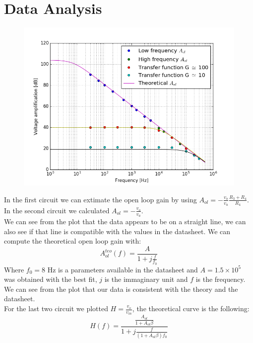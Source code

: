 \section{Data Analysis}
\begin{figure}[H]
\centering
\includegraphics[width=.7\textwidth]{4/decibel.png}
\end{figure}
In the first circuit we can extimate the open loop gain by using $A_{ol} = - \frac{v_{o}}{v_a} \frac{R_3 + R_4}{R_4}$.
In the second circuit we calculated $A_{ol} = - \frac{v_{o}}{v_a}$. \\
We can see from the plot that the data appears to be on a straight line, we can also see if that line is compatible with the values in the datasheet. We can compute the theoretical open loop gain with: $$A_{ol}^{teo}(f) = \frac{A}{1 + j\frac{f}{f_0}}$$ Where $f_0 = 8$ Hz is a parameters available in the datasheet and  $A = 1.5 \times 10^5$ was obtained with the best fit, $j$ is the immaginary unit and $f$ is the frequency. We can see from the plot that our data is consistent with the theory and the datasheet.\\
For the last two circuit we plotted $H = \frac{v_{o}}{v_{in}}$, the theoretical curve is the following:
\[H(f) = \frac{\frac{A_{ol} }{1 + A_{ol} \beta}}{1 + j \frac{f}{(1 + A_{ol} \beta)f_0}}\]

